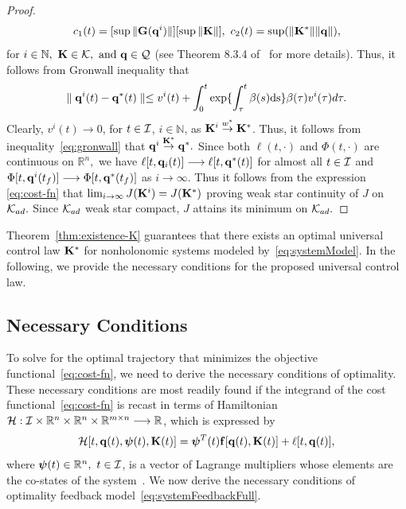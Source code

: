 \documentclass[
12pt,draftcls,onecolumn%
]{IEEEtran}
\begin{document}
\begin{proof}
\begin{align*}
c_1(t)=[\sup \|{\bf G}({\bf q}^i)\|][\sup \|{\bf K}\|],~c_2(t) = \sup(\|{\bf K}^*\|\|{\bf q}\|),
\end{align*}
for $i\in \mathbb{N},~{\bf K}\in{\cal K},~\text{and}~{\bf q}\in{\cal Q}$ (see Theorem 8.3.4 of~\cite[page 273]{Ahmed2006} for more details). Thus,  it follows from Gronwall inequality that 
\begin{equation} 
\parallel {\bf q}^i(t) - {\bf q}^*(t)\parallel \leq v^i(t) + 
\int_{0}^t \exp\{\int_{\tau}^t \beta(s)\mathrm{ds}\} \beta(\tau) v^i(\tau) d\tau.
\label{eq:gronwall}
\end{equation} 
Clearly, $v^i(t)\to 0$, for $t\in {\cal I}$, $i\in \mathbb{N}$, as ${\bf K}^i\buildrel w^* \over \to {\bf K}^*$. Thus, it follows from inequality~\eqref{eq:gronwall} that ${\bf q}^i\buildrel {\bf K}^*\over \to {\bf q}^*.$ 
%
Since both $\ell (t,\cdot)$ and $\Phi(t,\cdot)$ are continuous on $\mathbb{R}^n,$ we have  $\ell[t,{\bf q}_i(t)] \longrightarrow \ell[t,{\bf q}^*(t)] $ for almost all $t \in {\cal I}$ and $\Phi[t,{\bf q}^i(t_f)] \longrightarrow \Phi[t,{\bf q}^*(t_f)] $ as $i \rightarrow \infty.$ Thus it follows from the expression \eqref{eq:cost-fn} that  $ \lim_{i \rightarrow \infty} J({\bf K}^i)  =  J({\bf K}^*)$ proving weak star continuity of  $J$ on ${\cal K}_{ad}.$ Since ${\cal K}_{ad}$ weak  star compact, $J$  attains its minimum on ${\cal K}_{ad}.$ 
\end{proof}
% 
Theorem~\ref{thm:existence-K} guarantees that there exists an optimal universal control law ${\bf K}^*$ for nonholonomic systems modeled by~\eqref{eq:systemModel}. In the following, we provide the necessary conditions for the proposed universal control law.  

\subsection{Necessary Conditions}
\label{sec:necessaryConditions}

To solve for the optimal trajectory that minimizes the objective functional~\eqref{eq:cost-fn}, we need to derive the necessary conditions of optimality. These necessary conditions are most readily found if the integrand of the cost functional~\eqref{eq:cost-fn} is recast in terms of Hamiltonian 
$\mathcal{H}:{\cal I}\times \mathbb{R}^n\times\mathbb{R}^n\times\mathbb{R}^{m\times n} \longrightarrow \mathbb{R}$,
which is expressed by
%
\begin{equation}
\mathcal{H}[t, {\bf q}(t), \boldsymbol{\psi}(t),{\bf K}(t)] = \boldsymbol{\psi}^T(t){\bf f}[{\bf q}(t),{\bf K}(t)] + \ell[t,{\bf q}(t)],
\label{eq:hamiltonian}
\end{equation}
%
where $\boldsymbol{\psi}(t)\in\mathbb{R}^n,~t\in {\cal I}$, is a vector of Lagrange multipliers whose elements are the co-states of the system~\cite{Ahmed1988}. We now derive the necessary conditions of optimality feedback model~\eqref{eq:systemFeedbackFull}.
\end{document}
